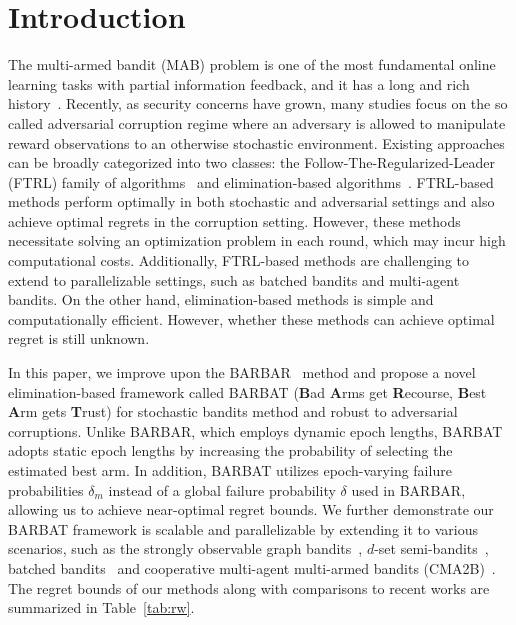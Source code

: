 \section{Introduction}
\label{sec:intr}

The multi-armed bandit (MAB) problem is one of the most fundamental online learning tasks with partial information feedback, and it has a long and rich history~\citep{lai1985asymptotically,auer2002finite}. 
Recently, as security concerns have grown, many studies focus on the so called adversarial corruption regime where an adversary is allowed to manipulate reward observations to an otherwise stochastic environment.
Existing approaches can be broadly categorized into two classes: the Follow-The-Regularized-Leader (FTRL) family of algorithms~\citep{zimmert2021tsallis,ito2021parameter,jin2024improved,tsuchiya2024stability} and elimination-based algorithms~\citep{lykouris2018stochastic,gupta2019better,liu2021cooperative,lu2021stochastic}. FTRL-based methods perform optimally in both stochastic and adversarial settings  and also achieve optimal regrets in the corruption setting. However, these methods necessitate solving an optimization problem in each round, which may incur high computational costs. Additionally, FTRL-based methods are challenging to extend to parallelizable settings, such as batched bandits and multi-agent bandits. On the other hand, elimination-based methods is simple and computationally efficient. However, whether these methods can achieve optimal regret is still unknown.

In this paper, we improve upon the BARBAR~\citep{gupta2019better} method and propose a novel elimination-based framework called BARBAT (\textbf{B}ad \textbf{A}rms get \textbf{R}ecourse, \textbf{B}est \textbf{A}rm gets \textbf{T}rust) for stochastic bandits method and robust to adversarial corruptions.
Unlike BARBAR, which employs dynamic epoch lengths, BARBAT adopts static epoch lengths by increasing the probability of selecting the estimated best arm. In addition, BARBAT utilizes epoch-varying failure probabilities $\delta_m$ instead of a global failure probability $\delta$ used in BARBAR, allowing us to achieve near-optimal regret bounds. We further demonstrate our BARBAT framework is scalable and parallelizable by extending it to various scenarios, such as the strongly observable graph bandits~\citep{ito2022nearly,dann2023blackbox}, $d$-set semi-bandits~\citep{zimmert2019beating,ito2021hybrid,tsuchiya2023further}, batched bandits~\citep{Perchet_2016,gao2019batched,esfandiari2021regret} and cooperative multi-agent multi-armed bandits (CMA2B)~\citep{wang2022achieving,liu2021cooperative,ghaffari2024multi}. The regret bounds of our methods along with comparisons to recent works are summarized in Table~\ref{tab:rw}.

